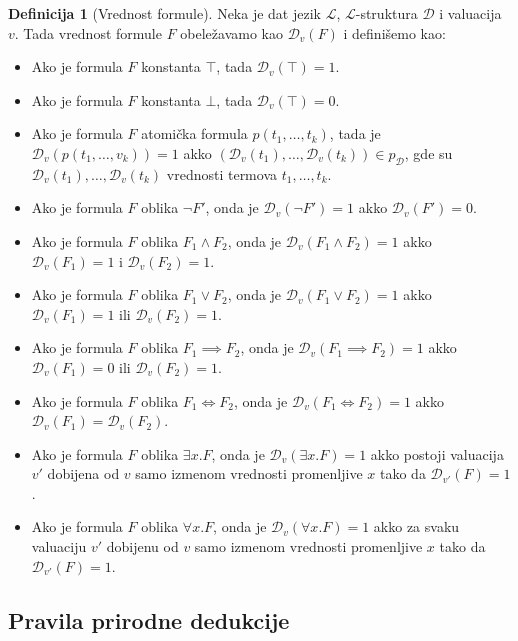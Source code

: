 \documentclass[a4paper,10pt]{article}
\theoremstyle{definition}
\newtheorem{definition}{Definicija}[section]
\begin{document}
\begin{definition}[Vrednost formule]
    Neka je dat jezik $\mathcal{L}$, $\mathcal{L}$-struktura $\mathcal{D}$ i valuacija $v$. Tada vrednost formule $F$ obeležavamo kao $\mathcal{D}_v (F)$ i definišemo kao:
    \begin{itemize}
        \item{Ako je formula $F$ konstanta $\top$, tada $\mathcal{D}_v(\top) = 1$.}
        \item{Ako je formula $F$ konstanta $\bot$, tada $\mathcal{D}_v(\top) = 0$.}
        \item{Ako je formula $F$ atomička formula $p(t_1, \ldots, t_k)$, tada je $\mathcal{D}_v(p(t_1, \ldots, v_k)) = 1$ akko $(\mathcal{D}_v(t_1), \ldots, \mathcal{D}_v(t_k)) \in p_\mathcal{D}$, gde su $\mathcal{D}_v(t_1), \ldots, \mathcal{D}_v(t_k)$ vrednosti termova $t_1, \ldots, t_k$.}
        \item{Ako je formula $F$ oblika $\neg F'$, onda je $\mathcal{D}_v(\neg F') = 1$ akko $\mathcal{D}_v(F') = 0$.}
        \item{Ako je formula $F$ oblika $F_1 \land F_2$, onda je $\mathcal{D}_v(F_1 \land F_2) = 1$ akko $\mathcal{D}_v(F_1) = 1$ i $\mathcal{D}_v(F_2) = 1$.}
        \item{Ako je formula $F$ oblika $F_1 \lor F_2$, onda je $\mathcal{D}_v(F_1 \lor F_2) = 1$ akko $\mathcal{D}_v(F_1) = 1$ ili $\mathcal{D}_v(F_2) = 1$.}
        \item{Ako je formula $F$ oblika $F_1 \implies F_2$, onda je $\mathcal{D}_v(F_1 \implies F_2) = 1$ akko $\mathcal{D}_v(F_1) = 0$ ili $\mathcal{D}_v(F_2) = 1$.}
        \item{Ako je formula $F$ oblika $F_1 \iff F_2$, onda je $\mathcal{D}_v(F_1 \iff F_2) = 1$ akko $\mathcal{D}_v(F_1) = \mathcal{D}_v(F_2)$.}
        \item{Ako je formula $F$ oblika $\exists x. F$, onda je $\mathcal{D}_v(\exists x. F) = 1$ akko postoji valuacija $v'$ dobijena od $v$ samo izmenom vrednosti promenljive $x$ tako da $\mathcal{D}_{v'}(F) = 1$.}
        \item{Ako je formula $F$ oblika $\forall x. F$, onda je $\mathcal{D}_v(\forall x. F) = 1$ akko za svaku valuaciju $v'$ dobijenu od $v$ samo izmenom vrednosti promenljive $x$ tako da $\mathcal{D}_{v'}(F) = 1$.}
    \end{itemize}
\end{definition}

\subsection{Pravila prirodne dedukcije}
\label{sub:natded}
\end{document}
